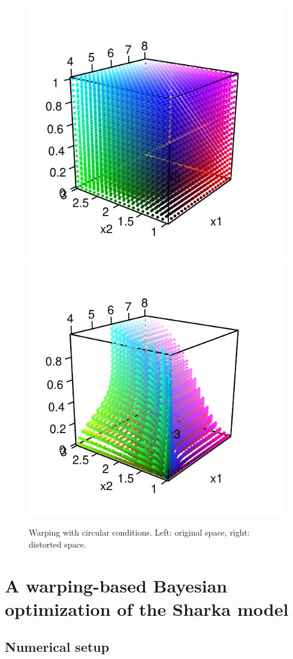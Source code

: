 	\begin{figure}[!ht]
		\centering
		\includegraphics[width=.4\textwidth]{def3Dcirc1.pdf}
		\includegraphics[width=.4\textwidth]{def3Dcirc2.pdf}
		\caption{Warping with circular conditions. Left: original space, right: distorted space.}\label{fig:def3Dcirc}
	\end{figure}
	
	
	\section{A warping-based Bayesian optimization of the Sharka model}
	
	\subsection{Numerical setup}
	
